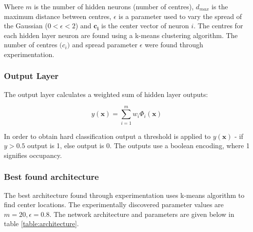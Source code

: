 \documentclass[a4paper, 11pt]{article}
\begin{document}
Where $m$ is the number of hidden neurons (number of centres), $d_{max}$ is the maximum distance between centres, $\epsilon$ is a parameter used to vary the spread of the Gaussian ($0<\epsilon<2$) and $\boldsymbol{c_i}$ is the center vector of neuron $i$. The centres for each hidden layer neuron are found using a k-means clustering algorithm. The number of centres $\boldsymbol(c_i)$ and spread parameter $\epsilon$ were found through experimentation.

\subsubsection*{Output Layer}
The output layer calculates a weighted sum of hidden layer outputs:

\begin{equation}
y(\boldsymbol{x}) = \displaystyle\sum_{i=1}^{m} w_i \Phi_i(\boldsymbol{x})
\end{equation}

In order to obtain hard classification output a threshold is applied to $y(\boldsymbol{x})$ - if $y>0.5$ output is 1, else output is 0. The outputs use a boolean encoding, where 1 signifies occupancy.

\subsubsection*{Best found architecture}
The best architecture found through experimentation uses k-means algorithm to find center locations. The experimentally discovered parameter values are $m = 20, \epsilon = 0.8$. The network architecture and parameters are given below in table \ref{table:architecture}.
\end{document}
